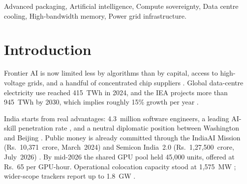 \documentclass[conference]{IEEEtran}
\begin{document}
\maketitle
\thispagestyle{empty}

\begin{abstract}
National AI sovereignty requires co-optimizing physical, microelectronic, and institutional infrastructure. Prevailing policy treats compute, power grids, data centres, connectivity, and governance in isolation, creating capital misallocations and grid vulnerabilities. This paper introduces the India AI Infrastructure Readiness Framework (IAIRF~2.0) and an auditable six-layer Demand-Cascade Model (DCM) parameterised using verified 2026 regulatory data. Four key findings emerge. First, deploying 500{,}000 accelerators demands 891.8~MW of peak facility power, absorbing over 56\% of India's operational colocation capacity. Second, domestic sub-5\,nm wafer fabrication is not the binding constraint: required logic wafer starts consume only 1.60\% of global foundry capacity, while CoWoS advanced packaging consumes 7.41\%---a 4.6$\times$ higher constraint intensity. Third, direct-to-chip liquid cooling slashes evaporative water withdrawal by 94.6\% and reduces facility power by 172~MW. Fourth, Mumbai's 52.4\% capacity concentration and 20--40\% dynamic AI load swings threaten transmission stability. A sequenced three-tier roadmap prioritising transmission corridors, packaging partnerships, and regional dispersion is presented.
\end{abstract}

\begin{IEEEkeywords}
Advanced packaging, Artificial intelligence, Compute sovereignty, Data centre cooling, High-bandwidth memory, Power grid infrastructure.
\end{IEEEkeywords}

\section{Introduction}

Frontier AI is now limited less by algorithms than by capital, access to high-voltage grids, and a handful of concentrated chip suppliers \cite{akimitsu2026chokepoints}. Global data-centre electricity use reached 415~TWh in 2024, and the IEA projects more than 945~TWh by 2030, which implies roughly 15\% growth per year \cite{iea2024aienergy}.

India starts from real advantages: 4.3~million software engineers, a leading AI-skill penetration rate \cite{linkedin2025aiindex}, and a neutral diplomatic position between Washington and Beijing \cite{stimson2026sovereign}. Public money is already committed through the IndiaAI Mission (Rs.~10{,}371~crore, March~2024) \cite{meity2024indiaai} and Semicon India~2.0 (Rs.~1{,}27{,}500~crore, July~2026) \cite{pib2026semicon2}. By mid-2026 the shared GPU pool held 45{,}000 units, offered at Rs.~65 per GPU-hour. Operational colocation capacity stood at 1{,}575~MW \cite{sbicap2025datacentre,cbre2026indiadc}; wider-scope trackers report up to 1.8~GW \cite{cushman2026h1,ceew2026datacentre}.
\end{document}
